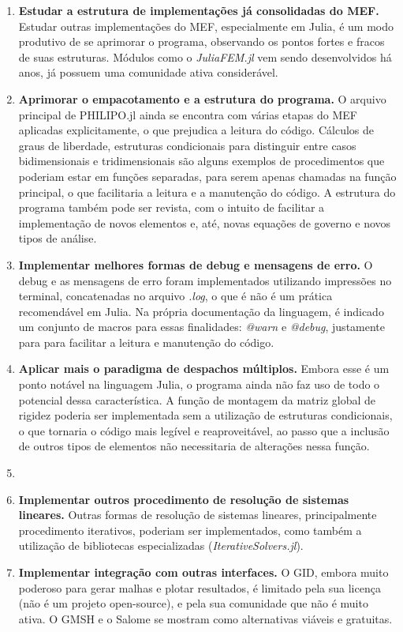 \begin{enumerate}
    \item \textbf{Estudar a estrutura de implementações já consolidadas do MEF.} Estudar outras implementações do MEF, especialmente em Julia, é um modo produtivo de se aprimorar o programa, observando os pontos fortes e fracos de suas estruturas. Módulos como o \emph{JuliaFEM.jl} vem sendo desenvolvidos há anos, já possuem uma comunidade ativa considerável.
    \item \textbf{Aprimorar o empacotamento e a estrutura do programa.} O arquivo principal de PHILIPO.jl ainda se encontra com várias etapas do MEF aplicadas explicitamente, o que prejudica a leitura do código. Cálculos de graus de liberdade, estruturas condicionais para distinguir entre casos bidimensionais e tridimensionais são alguns exemplos de procedimentos que poderiam estar em funções separadas, para serem apenas chamadas na função principal, o que facilitaria a leitura e a manutenção do código. A estrutura do programa também pode ser revista, com o intuito de facilitar a implementação de novos elementos e, até, novas equações de governo e novos tipos de análise.
    \item \textbf{Implementar melhores formas de debug e mensagens de erro.} O debug e as mensagens de erro foram implementados utilizando impressões no terminal, concatenadas no arquivo \emph{.log}, o que é não é um prática recomendável em Julia. Na própria documentação da linguagem, é indicado um conjunto de macros para essas finalidades: \emph{@warn} e \emph{@debug}, justamente para para facilitar a leitura e manutenção do código.
    \item \textbf{Aplicar mais o paradigma de despachos múltiplos.} Embora esse é um ponto notável na linguagem Julia, o programa ainda não faz uso de todo o potencial dessa característica. A função de montagem da matriz global de rigidez poderia ser implementada sem a utilização de estruturas condicionais, o que tornaria o código mais legível e reaproveitável, ao passo que a inclusão de outros tipos de elementos não necessitaria de alterações nessa função.
    \item \item \textbf{Implementar outros procedimento de resolução de sistemas lineares.} Outras formas de resolução de sistemas lineares, principalmente procedimento iterativos, poderiam ser implementados, como também a utilização de bibliotecas especializadas (\emph{IterativeSolvers.jl}).  
    \item \textbf{Implementar integração com outras interfaces.} O GID, embora muito poderoso para gerar malhas e plotar resultados, é limitado pela sua licença (não é um projeto open-source), e pela sua comunidade que não é muito ativa. O GMSH e o Salome se mostram como alternativas viáveis e gratuitas.

\end{enumerate}

